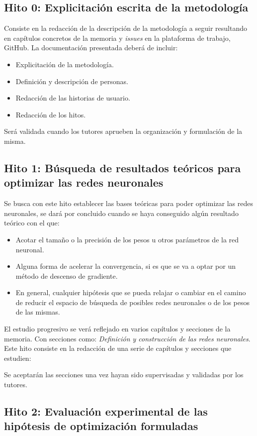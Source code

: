 \subsection*{Hito 0: Explicitación escrita de la metodología} 
Consiste en la redacción de la descripción de la metodología a seguir resultando en capítulos concretos de la memoria 
y \textit{issues} en la plataforma de trabajo, GitHub.  
La documentación presentada deberá de incluir: 
\begin{itemize}
    \item Explicitación de la metodología. 
    \item Definición y descripción de personas.
    \item Redacción de las historias de usuario.
    \item Redacción de los hitos.
\end{itemize}
Será validada cuando los tutores aprueben la organización y formulación de la misma.


\subsection*{Hito 1: Búsqueda de resultados teóricos para optimizar  las redes neuronales}

Se busca con este hito establecer las bases teóricas para poder optimizar las redes neuronales, se dará por concluido cuando se haya conseguido algún resultado teórico con el que:
\begin{itemize}
    \item Acotar el tamaño o la precisión de los pesos u otros parámetros de la red neuronal.
    \item Alguna forma de acelerar la convergencia, si es que se va a optar por un método de descenso de gradiente.
    \item En general, cualquier hipótesis que se pueda relajar o cambiar en el camino de reducir el espacio de búsqueda de posibles redes neuronales o de los pesos de las mismas.
\end{itemize}

El estudio progresivo se verá reflejado en varios capítulos y secciones de la memoria. Con secciones como: 
\textit{Definición  y construcción de las redes neuronales}. 
Este hito consiste en la redacción de una serie de capítulos y secciones 
que estudien: 

Se aceptarán las secciones una vez hayan sido supervisadas y validadas por los tutores. 

\subsection*{Hito 2: Evaluación experimental de las hipótesis de optimización formuladas}

